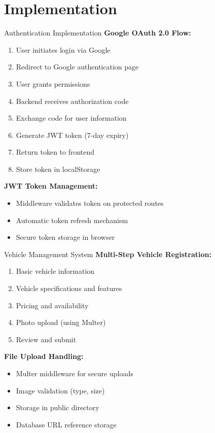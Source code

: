 \documentclass{beamer}
\begin{document}
\section{Implementation}

\begin{frame}{Authentication Implementation}
\textbf{Google OAuth 2.0 Flow:}
\begin{enumerate}
    \item User initiates login via Google
    \item Redirect to Google authentication page
    \item User grants permissions
    \item Backend receives authorization code
    \item Exchange code for user information
    \item Generate JWT token (7-day expiry)
    \item Return token to frontend
    \item Store token in localStorage
\end{enumerate}

\vspace{0.3cm}
\textbf{JWT Token Management:}
\begin{itemize}
    \item Middleware validates token on protected routes
    \item Automatic token refresh mechanism
    \item Secure token storage in browser
\end{itemize}
\end{frame}

\begin{frame}{Vehicle Management System}
\textbf{Multi-Step Vehicle Registration:}
\begin{enumerate}
    \item Basic vehicle information
    \item Vehicle specifications and features
    \item Pricing and availability
    \item Photo upload (using Multer)
    \item Review and submit
\end{enumerate}

\vspace{0.3cm}
\textbf{File Upload Handling:}
\begin{itemize}
    \item Multer middleware for secure uploads
    \item Image validation (type, size)
    \item Storage in public directory
    \item Database URL reference storage
\end{itemize}
\end{frame}
\end{document}
